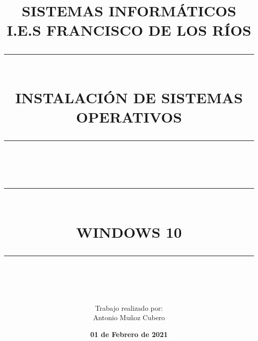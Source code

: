 \documentclass[12pt]{article}
\newcommand{\HRule}[1]{\rule{\linewidth}{#1}}
\begin{document}
\title{ \normalsize \textsc{SISTEMAS INFORMÁTICOS\\
I.E.S FRANCISCO DE LOS RÍOS}
		\\ [2.0cm]
		\HRule{0.5pt} \\
		\LARGE \textbf{\uppercase{Instalación de Sistemas Operativos}}
    \HRule{0.5pt} \\
    \HRule{2pt} \\ [0.5cm]
    \LARGE \textbf{\uppercase{WINDOWS 10}}
    \HRule{2pt} \\ [0.5cm]
    \normalsize  \vspace*{2\baselineskip}
    }

\author{
        Trabajo realizado por: \\
		Antonio Muñoz Cubero
	    \normalsize  \vspace*{4\baselineskip}
		}
\date{\textbf{01 de Febrero de 2021}}
\newpage
\maketitle
\newpage

\tableofcontents
\newpage

\sectionfont{\scshape}






\end{document}
